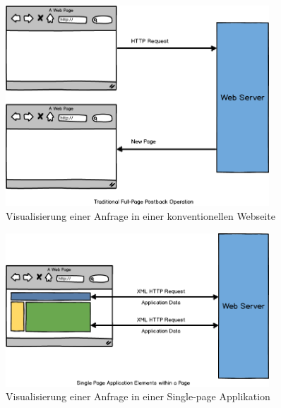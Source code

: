 \begin{figure}[ht]
	\centering
  \includegraphics[width=0.88\textwidth]{images/requestHtml.png}
	\caption{Visualisierung einer Anfrage in einer konventionellen Webseite}
	\label{fig:requestHtml}
\end{figure}

\begin{figure}[ht]
	\centering
  \includegraphics[width=0.88\textwidth]{images/requestXHtml.png}
	\caption{Visualisierung einer Anfrage in einer Single-page Applikation}
	\label{fig:requestXHtml}
\end{figure}


